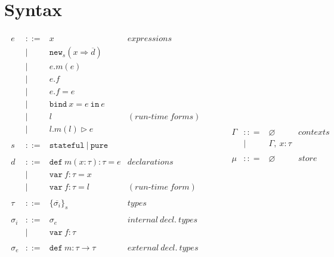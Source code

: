 \documentclass{llncs}
\newcommand{\keywadj}[1]{\mathtt{#1}}
\newcommand{\keyw}[1]{\keywadj{#1}~}
\begin{document}
\section{Syntax}

\[
\begin{array}{lll}
\begin{array}{lllr}
e & ::= & x & expressions \\
& | & \keywadj{new}_{s}(x \Rightarrow \overline{d}) \\
& | & e.m(e)\\
& | & e.f \\
& | & e.f = e \\
& | & \keyw{bind} x = e~\keyw{in} e \\
& | & l & (run\mbox{-}time~forms)\\
& | & l.m(l) \rhd e \\
&&\\
s & ::= & \keyw{stateful} | ~\keyw{pure} \\
&&\\
d & ::= & \keyw{def} m(x:\tau):\tau = e & declarations \\
  & |   & \keyw{var} f:\tau = x \\
  & |   & \keyw{var} f:\tau = l & (run\mbox{-}time~form)\\
&&\\
\tau & ::= & \{ \overline{\sigma_i} \}_{s} & types \\
&&\\
\sigma_i & ::= & \sigma_e & internal~decl.~ types \\
       & |   & \keyw{var} f:\tau \\
&&\\
\sigma_e & ::= & \keyw{def} m:\tau \rightarrow \tau & external~decl.~ types \\
&&\\
\end{array}
& ~~~~~~
&
\begin{array}{lllr}
\Gamma & :: = & \varnothing & contexts\\
& | & \Gamma,~x : \tau\\
&&\\
\mu & :: = & \varnothing & store\\

\end{array}
\end{array}\]
\end{document}
